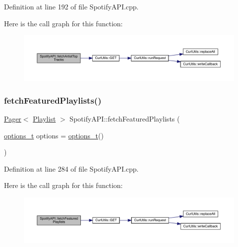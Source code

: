 Definition at line 192 of file Spotify\+A\+P\+I.\+cpp.

Here is the call graph for this function\+:
\nopagebreak
\begin{figure}[H]
\begin{center}
\leavevmode
\includegraphics[width=350pt]{class_spotify_a_p_i_a29a225f2f09d8a189b9c6214423cfe7e_cgraph}
\end{center}
\end{figure}
\mbox{\label{class_spotify_a_p_i_a74c7fb4877d5e5793110dca0e2fa9606}} 
\subsubsection{\texorpdfstring{fetch\+Featured\+Playlists()}{fetchFeaturedPlaylists()}}
{\footnotesize\ttfamily \mbox{\hyperlink{class_pager}{Pager}}$<$ \mbox{\hyperlink{class_playlist}{Playlist}} $>$ Spotify\+A\+P\+I\+::fetch\+Featured\+Playlists (\begin{DoxyParamCaption}\item[{\mbox{\hyperlink{_spotify_a_p_i_8h_a0ff5cac1a4007bb330b7d9939650c283}{options\+\_\+t}}}]{options = {\ttfamily \mbox{\hyperlink{_spotify_a_p_i_8h_a0ff5cac1a4007bb330b7d9939650c283}{options\+\_\+t}}()} }\end{DoxyParamCaption})}



Definition at line 284 of file Spotify\+A\+P\+I.\+cpp.

Here is the call graph for this function\+:
\nopagebreak
\begin{figure}[H]
\begin{center}
\leavevmode
\includegraphics[width=350pt]{class_spotify_a_p_i_a74c7fb4877d5e5793110dca0e2fa9606_cgraph}
\end{center}
\end{figure}
\mbox{\label{class_spotify_a_p_i_a04e6f0cef6120d389a29a760bb883ee0}} 
